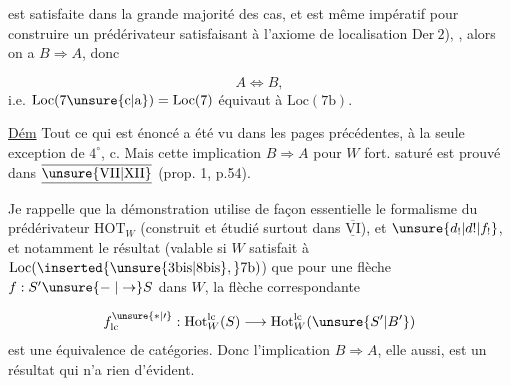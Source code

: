 
est satisfaite dans la grande majorité des cas, et est même impératif pour construire un prédérivateur satisfaisant à l'axiome de localisation $\mathrm{Der}\ 2$), , alors on a $B\Rightarrow A$,  donc

\[
 A\Longleftrightarrow B,
\]
i.e. $\mathrm{Loc}(7\unsure{\mathrm c|\mathrm a})=\mathrm{Loc}(7)$  équivaut à $\mathrm{Loc}(7\mathrm b)$.


\uline{Dém}  Tout ce qui est énoncé a été vu dans les pages précédentes, à la seule exception de $4^\circ$, c. Mais cette implication $B\Rightarrow A$ pour $W$ fort. saturé est prouvé dans $\underline{\overline{\unsure{\mathrm{VII}|\mathrm{XII}}}}$ (prop. 1, p.54).

Je rappelle que la démonstration utilise de façon essentielle le formalisme du  prédérivateur $\mathrm{HOT}_W$ (construit et étudié surtout dans $\underline{\overline{\mathrm{VI}}}$), et   $\unsure{d_!|d!|f_!}$, et notamment le résultat (valable si $W$ satisfait à $\mathrm{Loc}(\inserted{\unsure{3\mathrm{bis}|8\mathrm{bis}},}7\mathrm b)$) que pour une flèche $f:S'\unsure{\mathrel{-}|\to} S$ dans $W$, la flèche correspondante

\[
 f^{\unsure{*|\prime}}_{\mathrm{lc}}:\mathrm{Hot}^{\mathrm{lc}}_W(S)\longrightarrow\mathrm{Hot}^{\mathrm{lc}}_W(\unsure{S'|B'})
\]
est une équivalence de catégories. Donc l'implication $B\Rightarrow A$, elle aussi, est un résultat qui n'a rien d'évident.

